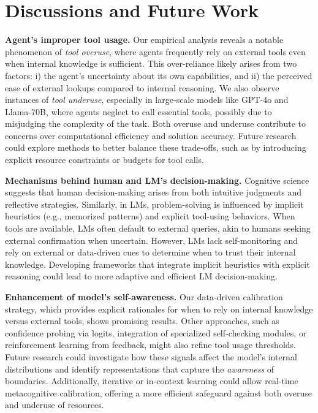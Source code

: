 \section{Discussions and Future Work}
\noindent\textbf{Agent's improper tool usage.}
Our empirical analysis reveals a notable phenomenon of \textit{tool overuse}, where agents frequently rely on external tools even when internal knowledge is sufficient. This over-reliance likely arises from two factors: i) the agent’s uncertainty about its own capabilities, and ii) the perceived ease of external lookups compared to internal reasoning. We also observe instances of \textit{tool underuse}, especially in large-scale models like GPT-4o and Llama-70B, where agents neglect to call essential tools, possibly due to misjudging the complexity of the task. Both overuse and underuse contribute to concerns over computational efficiency and solution accuracy. Future research could explore methods to better balance these trade-offs, such as by introducing explicit resource constraints or budgets for tool calls.

\vspace{1.5mm}
\noindent\textbf{Mechanisms behind human and LM's decision-making.}
Cognitive science suggests that human decision-making arises from both intuitive judgments and reflective strategies. Similarly, in LMs, problem-solving is influenced by implicit heuristics (e.g., memorized patterns) and explicit tool-using behaviors. When tools are available, LMs often default to external queries, akin to humans seeking external confirmation when uncertain. However, LMs lack self-monitoring and rely on external or data-driven cues to determine when to trust their internal knowledge. Developing frameworks that integrate implicit heuristics with explicit reasoning could lead to more adaptive and efficient LM decision-making.

\vspace{1.5mm}
\noindent\textbf{Enhancement of model's self-awareness.}
Our data-driven calibration strategy, which provides explicit rationales for when to rely on internal knowledge versus external tools, shows promising results. Other approaches, such as confidence probing via logits, integration of specialized self-checking modules, or reinforcement learning from feedback, might also refine tool usage thresholds. Future research could investigate how these signals affect the model's internal distributions and identify representations that capture the \textit{awareness} of boundaries. Additionally, iterative or in-context learning could allow real-time metacognitive calibration, offering a more efficient safeguard against both overuse and underuse of resources.

